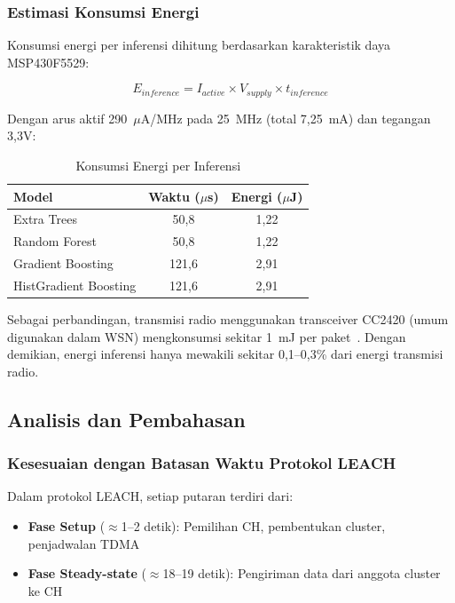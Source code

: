 \subsubsection{Estimasi Konsumsi Energi}

Konsumsi energi per inferensi dihitung berdasarkan karakteristik daya MSP430F5529:

\begin{equation}
    E_{inference} = I_{active} \times V_{supply} \times t_{inference}
\end{equation}

Dengan arus aktif 290~$\mu$A/MHz pada 25~MHz (total 7,25~mA) dan tegangan 3,3V:

\begin{table}[htbp]
\centering
\caption{Konsumsi Energi per Inferensi}
\label{tab:msp430_energy_id}
\begin{tabular}{lcc}
\hline
\textbf{Model} & \textbf{Waktu ($\mu$s)} & \textbf{Energi ($\mu$J)} \\
\hline
Extra Trees & 50,8 & 1,22 \\
Random Forest & 50,8 & 1,22 \\
Gradient Boosting & 121,6 & 2,91 \\
HistGradient Boosting & 121,6 & 2,91 \\
\hline
\end{tabular}
\end{table}

Sebagai perbandingan, transmisi radio menggunakan transceiver CC2420 (umum digunakan dalam WSN) mengkonsumsi sekitar 1~mJ per paket~\cite{polastre2005versatile}. Dengan demikian, energi inferensi hanya mewakili sekitar 0,1--0,3\% dari energi transmisi radio.

\subsection{Analisis dan Pembahasan}

\subsubsection{Kesesuaian dengan Batasan Waktu Protokol LEACH}

Dalam protokol LEACH, setiap putaran terdiri dari:
\begin{itemize}
    \item \textbf{Fase Setup} ($\approx$1--2 detik): Pemilihan CH, pembentukan cluster, penjadwalan TDMA
    \item \textbf{Fase Steady-state} ($\approx$18--19 detik): Pengiriman data dari anggota cluster ke CH
\end{itemize}

